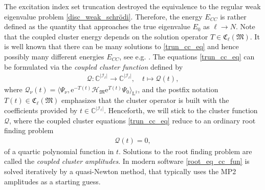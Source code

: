 \documentclass[reqno]{amsart}
\begin{document}
The excitation index set truncation destroyed the equivalence to the regular weak eigenvalue problem \eqref{disc_weak_schrödi}. Therefore, the energy $E_{CC}$ is rather defined as the quantity that approaches the true eigenvalue $E_0$ as $\ell \rightarrow N$. Note that the coupled cluster energy depends on the solution operator $T\in\mathfrak{C}_\ell(\mathfrak{M})$. It is well known that there can be many solutions to \eqref{trun_cc_eq} and hence possibly many different energies $E_{CC}$, see e.g. \cite{faulstich2024algebraicvarietiesquantumchemistry}. The equations \eqref{trun_cc_eq} can be formulated via the \textit{coupled cluster function} defined by
\begin{align}\label{cc_function}
    \mathcal{Q}: \mathbb{C}^{|\mathscr{I}_\ell|}\longrightarrow \mathbb{C}^{|\mathscr{I}_\ell|},\quad t\mapsto \mathcal{Q}(t),
\end{align}
where $\mathcal{Q}_\nu(t)=\langle \Psi_\nu, \mathrm{e}^{-T(t)}\mathcal{H}_\mathfrak{M}\mathrm{e}^{T(t)}\Psi_0\rangle_{\mathrm{L}^2}$, and the postfix notation $T(t)\in \mathfrak{C}_\ell (\mathfrak{M})$ emphasizes that the cluster operator is built with the coefficients provided by $t\in \mathbb{C}^{|\mathscr{I}_\ell|}$. Henceforth, we will stick to the cluster function $\mathcal{Q}$, where the coupled cluster equations \eqref{trun_cc_eq} reduce to an ordinary root finding problem
\begin{align}\label{root_eq_cc_fun}
    \mathcal{Q}(t)=0,
\end{align}
of a quartic polynomial function in $t$. Solutions to the root finding problem are called the \textit{coupled cluster amplitudes}.  In modern software \eqref{root_eq_cc_fun} is solved iteratively by a quasi-Newton method, that typically uses the MP2 amplitudes as a starting guess.
















    
\end{document}
